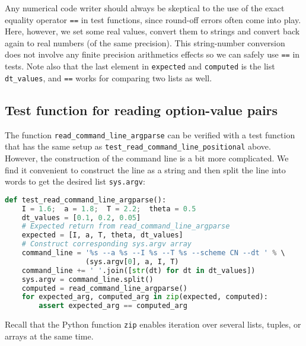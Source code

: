 \documentclass[graybox,sectrefs,envcountresetchap,open=right,final]{svmonodo}
\begin{document}
Any numerical code writer should always be skeptical to the use of the exact
equality operator \texttt{==} in test functions, since round-off errors often
come into play. Here, however, we set some real values, convert them
to strings and convert back again to real numbers (of the same precision).
This string-number conversion does not involve any finite precision
arithmetics effects so we
can safely use \texttt{==} in tests. Note also that the last element in
\texttt{expected} and \texttt{computed} is the list \Verb!dt_values!, and \texttt{==} works
for comparing two lists as well.

\subsection{Test function for reading option-value pairs}

The function \Verb!read_command_line_argparse! can be verified with a
test function that has the same setup as \Verb!test_read_command_line_positional!
above.
However, the construction of the command line is a bit more complicated.
We find it convenient to construct the line as a string and then
split the line into words to get the desired list \texttt{sys.argv}:

\begin{lstlisting}[language=Python,style=blue1_bluegreen]
def test_read_command_line_argparse():
    I = 1.6;  a = 1.8;  T = 2.2;  theta = 0.5
    dt_values = [0.1, 0.2, 0.05]
    # Expected return from read_command_line_argparse
    expected = [I, a, T, theta, dt_values]
    # Construct corresponding sys.argv array
    command_line = '%s --a %s --I %s --T %s --scheme CN --dt ' % \ 
                   (sys.argv[0], a, I, T)
    command_line += ' '.join([str(dt) for dt in dt_values])
    sys.argv = command_line.split()
    computed = read_command_line_argparse()
    for expected_arg, computed_arg in zip(expected, computed):
        assert expected_arg == computed_arg
\end{lstlisting}
Recall that the Python function \texttt{zip} enables iteration over
several lists, tuples, or arrays at the same time.
\end{document}
